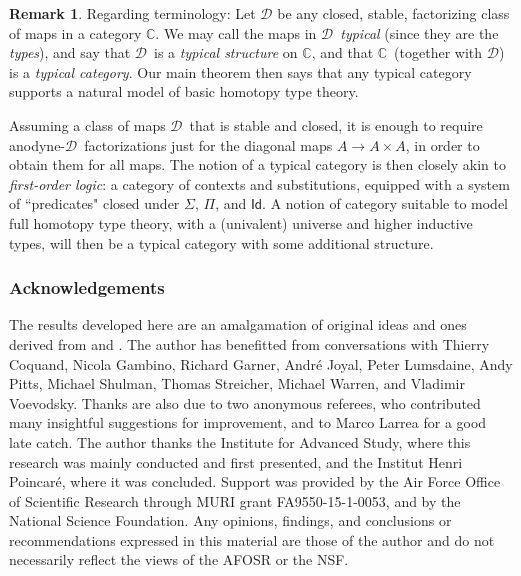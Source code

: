 \documentclass[12pt]{article}
\newcommand{\C}{\ensuremath{\mathbb{C}}}
\newcommand{\D}{\ensuremath{\mathcal{D}}}
\newcommand{\Id}{\mathsf{Id}}
\theoremstyle{definition}
\newtheorem{remark}[theorem]{Remark}
\begin{document}
\begin{remark}
Regarding terminology:
Let  $\D$ be any closed,  stable, factorizing class of maps in a category \C.  We may call the maps in \D\  \emph{typical} (since they are the \emph{types}), and say that \D\ is a \emph{typical structure} on \C, and that \C\ (together with \D) is a \emph{typical category}.  Our main theorem then says that any typical category supports a natural model of basic homotopy type theory. 

Assuming a  class of maps \D\  that is stable and closed, it is enough to require anodyne-\D\ factorizations just for the diagonal maps $A\to A\times A$,  in order to obtain them for all maps.  The notion of a typical category is then closely akin to \emph{first-order logic}: a category of contexts and substitutions, equipped with a system of ``predicates" closed under $\Sigma$, $\Pi$, and $\Id$.  A notion of category suitable to model full homotopy type theory, with a (univalent) universe and higher inductive types, will then be a typical category with some additional structure.
\end{remark}

\subsubsection*{Acknowledgements}

The  results developed here are an amalgamation of original ideas and ones derived from \cite{KLV} and \cite{LW}.  The author has benefitted from conversations with Thierry Coquand, Nicola Gambino, Richard Garner, Andr\'e Joyal, Peter Lumsdaine, Andy Pitts, Michael Shulman, Thomas Streicher, Michael Warren, and Vladimir Voevodsky.  Thanks are also due to two anonymous referees, who contributed many insightful suggestions for improvement, and to Marco Larrea for a good late catch.  The author thanks the Institute for Advanced Study, where this research was mainly conducted and first presented, and the Institut Henri Poincar\'e, where it was concluded.  Support was provided by the Air Force Office of Scientific Research through MURI grant FA9550-15-1-0053, and by the National Science Foundation. Any opinions, findings, and conclusions or recommendations expressed in this material are those of the author and do not necessarily reflect the views of the AFOSR or the NSF.  
\end{document}
